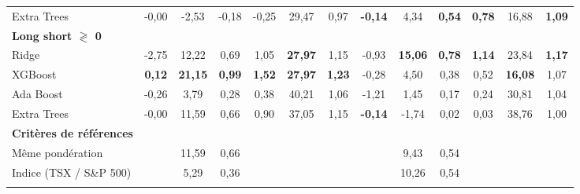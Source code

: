 \begin{table}[h]
{\begin{tabular}{l *{6}{S[table-format=3.2]} | *{6}{S[table-format=3.2]}}
Extra Trees & -0,00 & -2,53 & -0,18 & -0,25 & 29,47 & 0,97 & \bfseries\color{Green}-0,14 & 4,34 & \bfseries\color{Green}0,54 & \bfseries\color{Green}0,78 & 16,88 & \bfseries\color{Green}1,09 \\ \addlinespace[0.1cm]
\textbf{Long short $\gtrless$ 0} &  &  &  &  &  &  &  &  &  &  &  & \\
\addlinespace[0.1cm]
Ridge & -2,75 & 12,22 & 0,69 & 1,05 & \bfseries\color{Green}27,97 & 1,15 & -0,93 & \bfseries\color{Green}15,06 & \bfseries\color{Green}0,78 & \bfseries\color{Green}1,14 & 23,84 & \bfseries\color{Green}1,17 \\ \addlinespace[0.1cm]
XGBoost & \bfseries\color{Green}0,12 & \bfseries\color{Green}21,15 & \bfseries\color{Green}0,99 & \bfseries\color{Green}1,52 & \bfseries\color{Green}27,97 & \bfseries\color{Green}1,23 & -0,28 & 4,50 & 0,38 & 0,52 & \bfseries\color{Green}16,08 & 1,07 \\ \addlinespace[0.1cm]
Ada Boost & -0,26 & 3,79 & 0,28 & 0,38 & 40,21 & 1,06 & -1,21 & 1,45 & 0,17 & 0,24 & 30,81 & 1,04 \\ \addlinespace[0.1cm]
Extra Trees & -0,00 & 11,59 & 0,66 & 0,90 & 37,05 & 1,15 & \bfseries\color{Green}-0,14 & -1,74 & 0,02 & 0,03 & 38,76 & 1,00 \\ \addlinespace[0.1cm]
\textbf{Critères de références} &  &  &  &  &  &  &  &  &  &  &  & \\
\addlinespace[0.1cm]
Même pondération &  & 11,59 & 0,66 &  &  &  &  & 9,43 & 0,54 &  &  &  \\ \addlinespace[0.1cm]
Indice (TSX / S\&P 500) &  & 5,29 & 0,36 &  &  &  &  & 10,26 & 0,54 &  &  &  \\ \addlinespace[0.1cm]
\bottomrule
\end{tabular}}
\end{table}
